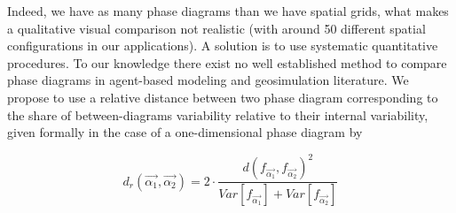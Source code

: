 \documentclass[Royal,sageh,times]{sagej}
\begin{document}
Indeed, we have as many phase diagrams than we have spatial grids, what makes a qualitative visual comparison not realistic (with around 50 different spatial configurations in our applications). A solution is to use systematic quantitative procedures. To our knowledge there exist no well established method to compare phase diagrams in agent-based modeling and geosimulation literature. We propose to use a relative distance between two phase diagram corresponding to the share of between-diagrams variability relative to their internal variability, given formally in the case of a one-dimensional phase diagram by



\begin{equation}\label{eq:phase-distance}
d_r\left(\vec{\alpha_1},\vec{\alpha_2}\right) = 2 \cdot \frac{d(f_{\vec{\alpha_1}},f_{\vec{\alpha_2}})^2}{Var\left[f_{\vec{\alpha_1}}\right] + Var\left[f_{\vec{\alpha_2}}\right]}
\end{equation}
\end{document}
